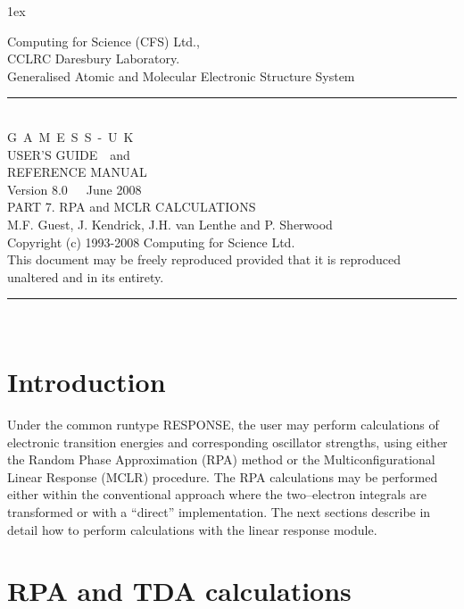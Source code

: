 \documentclass[11pt,fleqn]{article}
\begin{document}
\sf
\parindent 0cm
\parskip 1ex
\begin{flushleft}
 
Computing for Science (CFS) Ltd.,\\CCLRC Daresbury Laboratory.\\[0.30in]
{\large Generalised Atomic and Molecular Electronic Structure System }\\[.2in]
\rule{150mm}{3mm}\\
\vspace{.2in}
{\huge G~A~M~E~S~S~-~U~K}\\[.3in]
{\huge USER'S GUIDE~~and}\\[.2in]
{\huge REFERENCE MANUAL}\\[0.2in]
{\huge Version 8.0~~~June 2008}\\ [.2in]
{\large PART 7. RPA and MCLR CALCULATIONS}\\
\vspace{.1in}
{\large M.F. Guest, J. Kendrick, J.H. van Lenthe and P. Sherwood}\\[0.2in]
 
Copyright (c) 1993-2008 Computing for Science Ltd.\\[.1in]
This document may be freely reproduced provided that it is reproduced\\
unaltered and in its entirety.\\
\vspace{.2in}
\rule{150mm}{3mm}\\
\end{flushleft}

% 
\tableofcontents
\newpage


\section[Introduction]{Introduction}


Under the common runtype RESPONSE, the user may perform calculations
of electronic transition energies and corresponding oscillator strengths,
using either the Random Phase Approximation (RPA) method or the
Multiconfigurational Linear Response (MCLR) procedure. The RPA calculations
may be performed either within the conventional approach where the
two--electron integrals are transformed or with a ``direct'' 
implementation. The next sections describe in detail how to perform
calculations with the linear response module.
%
\section{RPA and TDA calculations}
\end{document}
